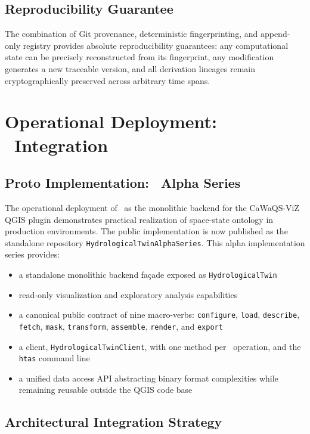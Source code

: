 \subsection{Reproducibility Guarantee}

The combination of Git provenance, deterministic fingerprinting, and append-only registry provides absolute reproducibility guarantees: any computational state can be precisely reconstructed from its fingerprint, any modification generates a new traceable version, and all derivation lineages remain cryptographically preserved across arbitrary time spans.

\section{Operational Deployment: \cwv\ Integration}

\subsection{Proto Implementation: \hydrot\ Alpha Series}

The operational deployment of \hydrot\ as the monolithic backend for the CaWaQS-ViZ QGIS plugin demonstrates practical realization of space-state ontology in production environments. The public implementation is now published as the standalone repository \texttt{HydrologicalTwinAlphaSeries}. This alpha implementation series provides:
\begin{itemize}
\item a standalone monolithic backend façade exposed as \texttt{HydrologicalTwin}
\item read-only visualization and exploratory analysis capabilities
\item a canonical public contract of nine macro-verbs: \texttt{configure}, \texttt{load}, \texttt{describe}, \texttt{fetch}, \texttt{mask}, \texttt{transform}, \texttt{assemble}, \texttt{render}, and \texttt{export}
\item a client, \texttt{HydrologicalTwinClient}, with one method per \cwv\ operation, and the \texttt{htas} command line
\item a unified data access API abstracting binary format complexities while remaining reusable outside the QGIS code base
\end{itemize}

\subsection{Architectural Integration Strategy}

